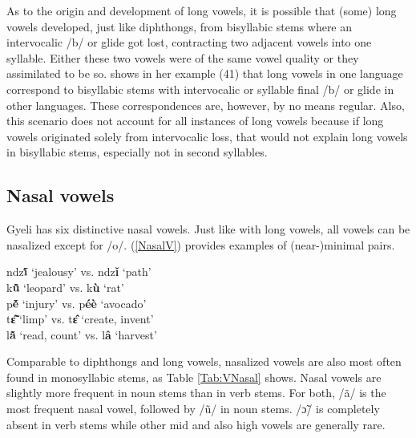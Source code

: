 As to the origin and development of long vowels, it is possible that (some) long vowels developed, just like diphthongs, from bisyllabic stems where an intervocalic /b/ or glide got lost, contracting two adjacent vowels into one syllable. Either these two vowels were of the same vowel quality or they assimilated to be so. \citet[328]{cheucle2014} shows in her example (41) that long vowels in one language correspond to bisyllabic stems with intervocalic or syllable final /b/ or glide in other languages. These correspondences are, however, by no means regular.
Also, this scenario does not account for all instances of long vowels because if long vowels originated solely from intervocalic loss, that would not explain long vowels in bisyllabic stems, especially not in second syllables.

\subsection{Nasal vowels}
\label {sec:NasalV}

Gyeli has six distinctive nasal vowels. Just like with long vowels, all vowels can be nasalized except for /o/. (\ref{NasalV}) provides examples of (near-)minimal pairs.

\begin{exe} \ex \label{NasalV}
ndz{\bfseries ĩ́} `jealousy' vs. ndz{\bfseries ǐ} `path' \\
k{\bfseries ũ̂} `leopard' vs. k{\bfseries ù} `rat' \\
p{\bfseries ẽ́} `injury' vs. p{\bfseries éè} `avocado' \\
t{\bfseries ɛ̃̂} `limp' vs. t{\bfseries ɛ̂} `create, invent' \\
l{\bfseries ã̂} `read, count' vs. l{\bfseries â} `harvest' \\
\end{exe}

Comparable to diphthongs and long vowels, nasalized vowels are also most often found in monosyllabic stems, as Table \ref{Tab:VNasal} shows. Nasal vowels are slightly more frequent in noun stems than in verb stems. For both, /ã/ is the most frequent nasal vowel, followed by /ũ/ in noun stems. /ɔ̃/ is completely absent in verb stems while other mid and also high vowels are generally rare.

